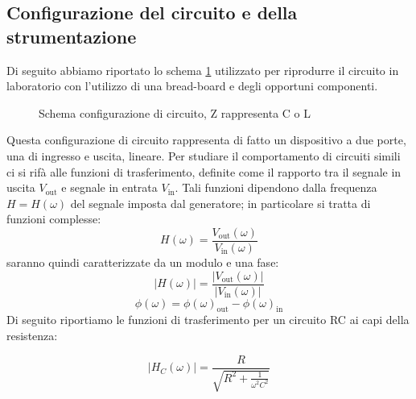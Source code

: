 \documentclass[letterpaper,12pt]{article}
\begin{document}
\subsection{Configurazione del circuito e della strumentazione}
Di seguito abbiamo riportato lo schema \ref{fig:config_circuito} utilizzato per riprodurre il circuito in laboratorio con l'utilizzo di una bread-board e degli opportuni componenti.
\begin{figure}[h!]
	\centering
	\caption{Schema configurazione di circuito, Z rappresenta C o L }
	\label{fig:config_circuito}
\end{figure}
Questa configurazione di circuito rappresenta di fatto un dispositivo a due porte, una di ingresso e uscita, lineare. Per studiare il comportamento di circuiti simili ci si rifà alle funzioni di trasferimento, definite come il rapporto tra il segnale in uscita $V_\text{out}$ e segnale in entrata $V_\text{in}$.
Tali funzioni dipendono dalla frequenza $H = H(\omega)$ del segnale imposta dal generatore; in particolare si tratta di funzioni complesse:
$$ H(\omega) = \frac{V_\text{out}(\omega)}{V_\text{in}(\omega)}$$
saranno quindi caratterizzate da un modulo e una fase:
$$ |{H(\omega)| = \frac{|V_\text{out}(\omega)|}{|V_\text{in}(\omega)|}}$$
$$ \phi(\omega) = \phi(\omega)_\text{out} - \phi(\omega)_\text{in} $$
Di seguito riportiamo le funzioni di trasferimento per un circuito RC ai capi della resistenza:

\begin{equation}
	\label{eq:Modulo RC (resistenza)}
	|H_C(\omega)| = \frac{R}{\sqrt{R^2 + \frac{1}{\omega^2C^2}}}
\end{equation}
\end{document}
